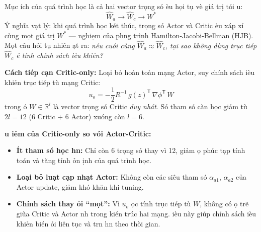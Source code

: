 \documentclass[12pt,a4paper]{article}
\newcommand{\R}{\mathbb{R}}
\newcommand{\T}{\mathsf{T}}
\begin{document}
M\d{u}c \dj\'{i}ch c\h{u}a qu\'{a} tr\`{i}nh h\d{o}c l\`{a} c\h{a} hai vector tr\d{o}ng s\'{o} \dj\`{e}u h\d{o}i t\d{u} v\`{e} gi\'{a} tr\d{i} t\'{o}i \uhorn{}u:
\begin{equation}
    \hat{W}_a \to \hat{W}_c \to W^*
\end{equation}
\'{Y} ngh\~{i}a v\d{a}t l\'{y}: khi qu\'{a} tr\`{i}nh h\d{o}c k\'{e}t th\'{u}c, tr\d{o}ng s\'{o} Actor v\`{a} Critic \dj\`{e}u x\'{a}p x\h{i} c\`{u}ng m\d{o}t gi\'{a} tr\d{i} $W^*$ --- nghi\d{e}m c\h{u}a ph\uhorn{}\ohorn{}ng tr\`{i}nh Hamilton-Jacobi-Bellman (HJB). M\d{o}t c\^{a}u h\h{o}i t\d{u} nhi\^{e}n \dj\d{a}t ra: \textit{n\'{e}u cu\'{o}i c\`{u}ng $\hat{W}_a \approx \hat{W}_c$, t\d{a}i sao kh\^{o}ng d\`{u}ng tr\d{u}c ti\'{e}p $\hat{W}_c$ \dj\h{e} t\'{i}nh ch\'{i}nh s\'{a}ch \dj i\`{e}u khi\h{e}n?}

\textbf{C\'{a}ch ti\'{e}p c\d{a}n Critic-only:} Lo\d{a}i b\h{o} ho\`{a}n to\`{a}n m\d{a}ng Actor, suy ch\'{i}nh s\'{a}ch \dj i\`{e}u khi\h{e}n tr\d{u}c ti\'{e}p t\`{u} m\d{a}ng Critic:
\begin{equation}\label{eq:cl_control}
    \boxed{u_o = -\frac{1}{2} R^{-1}\, g(z)^\T\, \nabla\phi^\T\, W}
\end{equation}
trong \dj\'{o} $W \in \R^l$ l\`{a} vector tr\d{o}ng s\'{o} Critic \textit{duy nh\'{a}t}. S\'{o} tham s\'{o} c\`{a}n h\d{o}c gi\h{a}m t\`{u} $2l = 12$ (6 Critic + 6 Actor) xu\'{o}ng c\`{o}n $l = 6$.

\textbf{\Uhorn{}u \dj i\h{e}m c\h{u}a Critic-only so v\'{o}i Actor-Critic:}
\begin{itemize}
    \item \textbf{\'{I}t tham s\'{o} h\d{o}c h\ohorn{}n:} Ch\h{i} c\`{o}n 6 tr\d{o}ng s\'{o} thay v\`{i} 12, gi\h{a}m \dj\d{o} ph\'{u}c t\d{a}p t\'{i}nh to\'{a}n v\`{a} t\u{a}ng t\'{i}nh \h{o}n \dj\d{i}nh c\h{u}a qu\'{a} tr\`{i}nh h\d{o}c.
    \item \textbf{Lo\d{a}i b\h{o} lu\d{a}t c\d{a}p nh\d{a}t Actor:} Kh\^{o}ng c\`{o}n c\'{a}c si\^{e}u tham s\'{o} $\alpha_{a1}$, $\alpha_{a2}$ c\h{u}a Actor update, gi\h{a}m kh\'{o} kh\u{a}n khi tuning.
    \item \textbf{Ch\'{i}nh s\'{a}ch thay \dj\h{o}i ``m\uhorn{}\d{o}t'':} V\`{i} $u_o$ \dj\uhorn{}\d{o}c t\'{i}nh tr\d{u}c ti\'{e}p t\`{u} $W$, kh\^{o}ng c\'{o} \dj\d{o} tr\~{e} gi\~{u}a Critic v\`{a} Actor nh\uhorn{} trong ki\'{e}n tr\'{u}c hai m\d{a}ng. \DJ i\`{e}u n\`{a}y gi\'{u}p ch\'{i}nh s\'{a}ch \dj i\`{e}u khi\h{e}n bi\'{e}n \dj\h{o}i li\^{e}n t\d{u}c v\`{a} tr\ohorn{}n h\ohorn{}n theo th\`{o}i gian.
\end{itemize}
\end{document}
